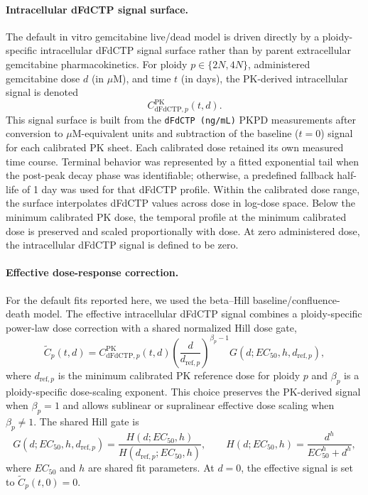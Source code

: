 \documentclass[11pt,notitlepage]{article}
\begin{document}
\paragraph{Intracellular dFdCTP signal surface.}
The default in vitro gemcitabine live/dead model is driven directly by a ploidy-specific intracellular dFdCTP signal surface rather than by parent extracellular gemcitabine pharmacokinetics. For ploidy $p\in\{2N,4N\}$, administered gemcitabine dose $d$ (in $\mu$M), and time $t$ (in days), the PK-derived intracellular signal is denoted
\[
C_{\mathrm{dFdCTP},p}^{\mathrm{PK}}(t,d).
\]
This signal surface is built from the \texttt{dFdCTP (ng/mL)} PKPD measurements after conversion to $\mu$M-equivalent units and subtraction of the baseline ($t=0$) signal for each calibrated PK sheet. Each calibrated dose retained its own measured time course. Terminal behavior was represented by a fitted exponential tail when the post-peak decay phase was identifiable; otherwise, a predefined fallback half-life of 1 day was used for that dFdCTP profile. Within the calibrated dose range, the surface interpolates dFdCTP values across dose in log-dose space. Below the minimum calibrated PK dose, the temporal profile at the minimum calibrated dose is preserved and scaled proportionally with dose. At zero administered dose, the intracellular dFdCTP signal is defined to be zero.

\paragraph{Effective dose-response correction.}
For the default fits reported here, we used the beta--Hill baseline/confluence-death model. The effective intracellular dFdCTP signal combines a ploidy-specific power-law dose correction with a shared normalized Hill dose gate,
\[
\widetilde{C}_{p}(t,d)
=
C_{\mathrm{dFdCTP},p}^{\mathrm{PK}}(t,d)
\left(\frac{d}{d_{\mathrm{ref},p}}\right)^{\beta_p-1}
G(d;EC_{50},h,d_{\mathrm{ref},p}),
\]
where $d_{\mathrm{ref},p}$ is the minimum calibrated PK reference dose for ploidy $p$ and $\beta_p$ is a ploidy-specific dose-scaling exponent. This choice preserves the PK-derived signal when $\beta_p=1$ and allows sublinear or supralinear effective dose scaling when $\beta_p\neq 1$. The shared Hill gate is
\[
G(d;EC_{50},h,d_{\mathrm{ref},p})
=
\frac{H(d;EC_{50},h)}{H(d_{\mathrm{ref},p};EC_{50},h)},
\qquad
H(d;EC_{50},h)=\frac{d^h}{EC_{50}^h+d^h},
\]
where $EC_{50}$ and $h$ are shared fit parameters. At $d=0$, the effective signal is set to $\widetilde{C}_p(t,0)=0$.
\end{document}

